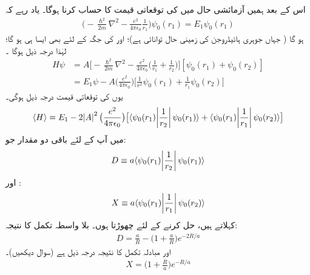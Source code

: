  اس کے بعد ہمیں آزمائشی حال    میں  کی توقعاتی قیمت کا حساب کرنا ہوگا۔ یاد رہے کہ 
 \begin{align*}
\big(-\frac{\hslash^{2}}{2m}\nabla^{2}-\frac{e^{2}}{4\pi\epsilon_{0}}\frac{1}{r_{1}}\big)\psi_{0}(r_{1})=E_{1}\psi_{0}(r_{1})
\end{align*}
ہو گا (  جہاں     جوہری ہائیڈروجن کی زمینی حال توانائی ہے)؛  اور  کی جگہ  کے لئے بھی ایسا ہی   ہو گا؛ لہٰذا  درجہ ذیل ہوگا ۔
\begin{align*}
 H\psi&=A\big[-\frac{\hslash^{2}}{2m}\nabla^{2}-\frac{e^{2}}{4\pi\epsilon_{0}}\big(\frac{1}{r_{1}}+\frac{1}{r_{2}}\big)\big][\psi_{0}(r_{1})+\psi_{0}(r_{2})]\\
&=E_{1}\psi-A\big(\frac{e^{2}}{4\pi\epsilon_{0}}\big)\big[\frac{1}{r^{2}}\psi_{0}(r_{1})+\frac{1}{r_{1}}\psi_{0}(r_{2})\big]
\end{align*}
 یوں کی توقعاتی قیمت درجہ ذیل ہوگی۔
\begin{align}
\langle H \rangle =E_{1}-2\abs{A}^{2}\big(\frac{e^{2}}{4\pi\epsilon_{0}}\big)\big[\langle \psi_{0}(r_{1})\abs{\frac{1}{r_{2}}}\psi_{0}(r_{1})\rangle +\langle \psi_{0}(r_{1})\abs{\frac{1}{r_{1}}}\psi_{0}(r_{2})\rangle\big]
\end{align}
 میں آپ کے لئے باقی دو مقدار جو: 
\begin{align}\label{مساوات_تغیریت_بلاواسطہ_تکمل}
D\equiv a\langle \psi_{0}(r_{1})\abs{\frac{1}{r_{2}}}\psi_{0}(r_{1})\rangle
\end{align}
 اور  : 
\begin{align}\label{مساوات_تغیریت_مبادلہ_تکمل}
X\equiv a\langle\psi_{0}(r_{1})\abs{\frac{1}{r_{1}}}\psi_{0}(r_{2})\rangle
\end{align}
 کہلاتے ہیں،  حل کرنے کے لئے چھوڑتا ہوں۔ بلا واسطہ تکمل کا نتیجہ:
\begin{align}\label{مساوات_تغیریت_نتیجہ_بلاواسطہ_تکمل}
D=\frac{a}{R}-\big(1+\frac{a}{R}\big)e^{-2R/a} 
\end{align}
 اور مبادلہ تکمل کا نتیجہ درجہ ذیل ہے  (سوال  دیکھیں)۔  
\begin{align}\label{مساوات_تغیریت_نتیجہ_مبادلہ_تکمل}
X=\big(1+\frac{R}{a}\big)e^{-R/a} 
\end{align}

